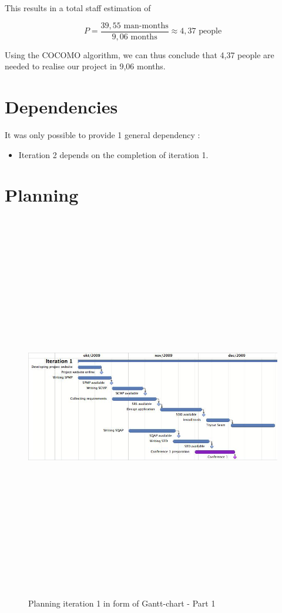 \documentclass[salesmen, twoside]{../../../templates/latex/2009/softproj}
\begin{document}
\begin{projdoc}
			This results in a total staff estimation of
			
				\[ P = \frac{39,55 \textrm{ man-months}}{9,06 \textrm{ months}} \approx 4,37 \textrm{ people} \]
			
			Using the COCOMO algorithm, we can thus conclude that 4,37 people are needed to
			realise our project in 9,06 months. 
			
			\section {Dependencies}
			
			It was only possible to provide 1 general dependency :
			
			\begin{itemize}
				
				\item Iteration 2 depends on the completion of iteration 1.
				
			\end{itemize}
			
			
			\section{Planning}	
				\label{planning}
			\begin{figure}[h!]
				\begin{center}
				\includegraphics[angle=90, height=17cm]{../../img/gantt-chart-1iter-1.jpg}
				\caption{Planning iteration 1 in form of Gantt-chart - Part 1}
			\end{center}
			\end{figure}
			

\end{projdoc}
\end{document}
